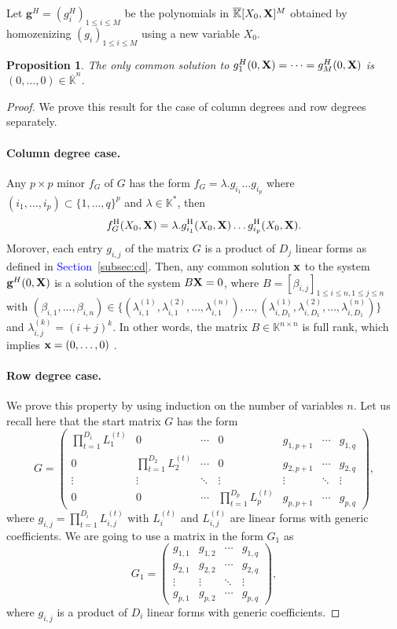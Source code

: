 \documentclass[11pt]{article}
\numberwithin{Property}{section}
\numberwithin{Theorem}{section}
\newtheorem{Proposition}{Proposition}%
\numberwithin{Proposition}{section}
\numberwithin{Lemma}{section}
\numberwithin{Corollary}{section}
\numberwithin{Definition}{section}
\numberwithin{Remark}{section}
\numberwithin{Conjecture}{section}
\numberwithin{Problem}{section}
\numberwithin{Claim}{section}
\theoremstyle{definition}
\numberwithin{Example}{section}
\def\g {\ensuremath{\mathbf{g}}}
\renewcommand{\leq}{\leqslant}
\def\bar{\overline}
\newcommand{\field}{\mathbb{K}} %
\newcommand{\mat}[1]{\mathbf{\MakeUppercase{#1}}} %
\newcommand{\improve}[1]{\textcolor{blue}{#1}} %
\begin{document}
Let $\g^H = (g_{i}^H)_{1 \leq i \leq M}$ be the polynomials in $\bar{\field}[X_0, \mat{X}]^M$ obtained by homozenizing  $(g_i)_{1 \leq i \leq M}$ using a new variable $X_0$. 

\begin{Proposition} \label{sol} The only common solution to $g_1^H(0,\mat{X}) = \cdots = g_M^H(0,\mat{X})$ is $(0, \ldots, 0)\in \bar{\field}^n$. 
\end{Proposition}

\begin{proof} We prove this result for the case of column degrees and row degrees separately.
\paragraph{Column degree case.} Any $p \times p$ minor $f_G$ of $G$ has the form $f_G = \lambda. g_{i_1} \ldots g_{i_p}$ where $(i_1, \ldots, i_p)\subset \{1, \ldots, q\}^p$ and $\lambda \in \field^*$, then 
\[
f_G^{\mathrm{H}}(X_0, \mat{X}) = \lambda.g_{i_1}^{\mathrm{H}}(X_0,\mat{X}) \ldots g_{i_p}^{\mathrm{H}}(X_0, \mat{X}).\]
Morover, each entry $g_{i,j}$ of the matrix $G$ is a product of $D_j$ linear forms as defined in \improve{Section~\ref{subsec:cd}}. Then, any common solution ${\bf x}$ to the system $\g^H(0,\mat{X})$ is a solution of the system $B\mat{X} = 0$, where $B = [\beta_{i,j}]_{1 \leq i \leq n, 1 \leq j \leq n}$ with $(\beta_{i,1}, \ldots, \beta_{i,n}) \in \{(\lambda_{i,1}^{(1)}, \lambda_{i,1}^{(2)}, \ldots, \lambda_{i,1}^{(n)}), \ldots, (\lambda_{i,D_1}^{(1)}, \lambda_{i,D_1}^{(2)}, \ldots, \lambda_{i,D_1}^{(n)})\}$ and $\lambda_{i,j}^{(k)} = (i+j)^k$. In other words, the matrix $B \in \field^{n \times n}$ is full rank, which implies ${\bf x} = (0, \ldots, 0)$ . 
\paragraph{Row degree case.} We prove this property by using induction on the number of variables $n$. Let us recall here that the start matrix $G$ has the form 
\[
G = \left( \begin{matrix}
\prod_{t=1}^{D_1}L_1^{(t)} & 0 & \cdots & 0 & g_{1,p+1} & \cdots & g_{1, q}\\
0 & \prod_{t=1}^{D_2}L_2^{(t)} & \cdots & 0 & g_{2,p+1} & \cdots & g_{2, q}\\
\vdots & \vdots & \ddots & \vdots & \vdots & \ddots & \vdots\\
0 & 0 & \cdots & \prod_{t=1}^{D_p}L_p^{(t)} & g_{p,p+1} & \cdots & g_{p, q}
\end{matrix} \right),
\]where $g_{i,j} = \prod_{t=1}^{D_i}L_{i,j}^{(t)}$ with $L_i^{(t)}$ and $L_{i,j}^{(t)}$ are linear forms with generic coefficients. We are going to use a matrix in the form $G_1$ as 
\[G_1 = \left( \begin{matrix}
g_{1,1} & g_{1,2} & \cdots  & g_{1, q}\\
g_{2,1} & g_{2,2} & \cdots  & g_{2, q}\\
\vdots & \vdots & \ddots & \vdots \\
g_{p,1} & g_{p,2} & \cdots  & g_{p, q}
\end{matrix} \right),  \]
where $g_{i,j}$ is a product of $D_i$ linear forms with generic coefficients. 


\end{proof}
\end{document}
